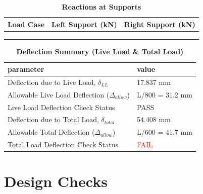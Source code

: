 \documentclass[12pt,a4paper]{report}
\numberwithin{table}{chapter}
\numberwithin{figure}{chapter}
\begin{document}
\vspace{1em}
\begin{longtable}{|>{\centering\arraybackslash}p{5.2cm}|>{\centering\arraybackslash}p{5.2cm}|>{\centering\arraybackslash}p{5.2cm}|}
\caption{\textbf{Reactions at Supports}}
\hline
\textbf{Load Case} & \textbf{Left Support (kN)} & \textbf{Right Support (kN)} \\[6pt]
\hline
 &  &  \\[6pt]
\hline
 &  &  \\[6pt]
\hline
 &  &  \\[6pt]
\hline
\end{longtable}

\vspace{1em}
\begin{longtable}{|L{7cm}|p{8.5cm}|}
\caption{\textbf{Deflection Summary (Live Load \& Total Load)}}
\hline
\textbf{parameter} & \textbf{value} \\
\hline
\textnormal{Deflection due to Live Load, $\delta_{LL}$} & 17.837 mm \\[6pt]
\hline
\textnormal{Allowable Live Load Deflection ($\Delta_{allow}$)} & L/800 = 31.2 mm \\[6pt]
\hline
\textnormal{Live Load Deflection Check Status} & PASS \\[6pt]
\hline
\textnormal{Deflection due to Total Load, $\delta_{total}$} & 54.408 mm \\[6pt]
\hline
\textnormal{Allowable Total Deflection ($\Delta_{allow}$)} & L/600 = 41.7 mm \\[6pt]
\hline
\textnormal{Total Load Deflection Check Status} & \textcolor{red}{FAIL} \\[6pt]
\hline
\end{longtable}

\vspace{1em}
\noindent
\noindent{}
\noindent{}
\noindent{}


\chapter{Design Checks}
\end{document}
